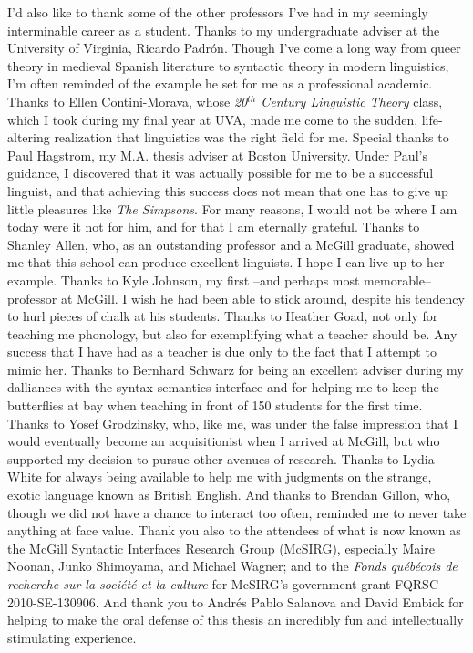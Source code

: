 I'd also like to thank some of the other professors I've had in my seemingly interminable career as a student. Thanks to my undergraduate adviser at the University of Virginia, Ricardo Padr\'{o}n. Though I've come a long way from queer theory in medieval Spanish literature to syntactic theory in modern linguistics, I'm often reminded of the example he set for me as a professional academic. Thanks to Ellen Contini-Morava, whose \textit{20$^{th}$ Century Linguistic Theory} class, which I took during my final year at UVA, made me come to the sudden, life-altering realization that linguistics was the right field for me. Special thanks to Paul Hagstrom, my M.A. thesis adviser at Boston University. Under Paul's guidance, I discovered that it was actually possible for me to be a successful linguist, and that achieving this success does not mean that one has to give up little pleasures like {\it The Simpsons}. For many reasons, I would not be where I am today were it not for him, and for that I am eternally grateful. Thanks to Shanley Allen, who, as an outstanding professor and a McGill graduate, showed me that this school can produce excellent linguists. I hope I can live up to her example. Thanks to Kyle Johnson, my first --and perhaps most memorable-- professor at McGill. I wish he had been able to stick around, despite his tendency to hurl pieces of chalk at his students. Thanks to Heather Goad, not only for teaching me phonology, but also for exemplifying what a teacher should be. Any success that I have had as a teacher is due only to the fact that I attempt to mimic her. Thanks to Bernhard Schwarz for being an excellent adviser during my dalliances with the syntax-semantics interface and for helping me to keep the butterflies at bay when teaching in front of 150 students for the first time. Thanks to Yosef Grodzinsky, who, like me, was under the false impression that I would eventually become an acquisitionist when I arrived at McGill, but who supported my decision to pursue other avenues of research. Thanks to Lydia White for always being available to help me with judgments on the strange, exotic language known as British English. And thanks to Brendan Gillon, who, though we did not have a chance to interact too often, reminded me to never take anything at face value. Thank you also to the attendees of what is now known as the McGill Syntactic Interfaces Research Group (McSIRG), especially Maire Noonan, Junko Shimoyama, and Michael Wagner; and to the \textit{Fonds qu\'{e}b\'{e}cois de recherche sur la soci\'{e}t\'{e} et la culture} for McSIRG's government grant FQRSC 2010-SE-130906. And thank you to Andr\'{e}s Pablo Salanova and David Embick for helping to make the oral defense of this thesis an incredibly fun and intellectually stimulating experience.

